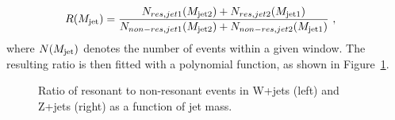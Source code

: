 \begin{align}
R(M_{\rm jet}) &= \frac{N_{res,jet1}(M_{\rm jet2})+N_{res,jet2}(M_{\rm jet1})}{N_{non-res,jet1}(M_{\rm jet2}) + N_{non-res,jet2}(M_{\rm jet1})}~,
\end{align}
where $N(M_{\rm jet})$ denotes the number of events within a given \MJ window. The resulting ratio is then fitted with a polynomial function, as shown in Figure~\ref{fig:ratio_Vjets}.
\begin{figure}[h]
\centering
{}
\caption{Ratio of resonant to non-resonant events in  W+jets (left) and Z+jets (right) as a function of jet mass.}
\label{fig:ratio_Vjets}
\end{figure}
